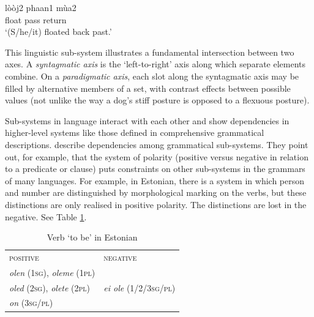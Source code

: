 \ea
\gll lòòj2 phaan1 mùa2 \\
     float pass return \\
\glt \textquoteleft (S/he/it) floated back past.'
\z


This linguistic sub-system illustrates a fundamental 
intersection between two axes. A \textit{syntagmatic axis} is the `left-to-right' axis along 
which separate elements combine. On a \textit{paradigmatic axis}, each slot along the syntagmatic axis
may be filled by alternative members of a set, with contrast 
effects between possible values (not unlike the way a dog's stiff posture 
is opposed to a flexuous posture). 



Sub-systems in language interact with each other and show dependencies 
in higher-level systems like those defined in comprehensive 
grammatical descriptions. \citet{aikhenvald_dependencies_1998} describe 
dependencies among grammatical sub-systems. They point out, for example, that 
the system of polarity (positive versus negative in relation to a 
predicate or clause) puts constraints on other sub-systems in the grammars of 
many languages. For example, in Estonian, there is a system in which person and number are 
distinguished by morphological marking on the verbs, but these 
distinctions are only realised in positive polarity. The distinctions 
are lost in the negative. See Table \ref{verbtobeinestonian}.





\begin{table}[h]
\centering
\begin{tabular}{ll}

\textsc{positive} & \textsc{negative} \\

\textit{olen} (\textsc{1sg)}, \textit{oleme} (\textsc{1pl}) 
& \\

\textit{oled} (\textsc{2sg)}, \textit{olete }(\textsc{2pl)} & 
\textit{ei ole} (1/2/3\textsc{sg/pl}) \\

\textit{on} (\textsc{3sg/pl}) & \\

\end{tabular}
\caption{Verb \textquoteleft to be' in Estonian}
\label{verbtobeinestonian}
\end{table}


